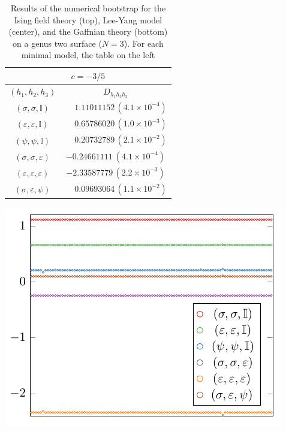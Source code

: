 \documentclass[a4paper,11pt]{article}
\begin{document}
\begin{table}[tbp]
\begin{minipage}{0.5\linewidth}
\centering
\begin{tabular}{|c|c|}
\multicolumn{2}{c}{$c=-3/5$}\\
\hline 
  $(h_1, h_2, h_3)$ &  $D_{h_1 h_2 h_3}$ \\ 
 \hline
 $(\sigma, \sigma, \mathbb{I})$ &            $\phantom{-}1.11011152\,(4.1\times10^{-4})$        \\
 $(\varepsilon, \varepsilon, \mathbb{I})$ &  $\phantom{-}0.65786020\,(1.0\times10^{-3})$        \\
 $(\psi, \psi, \mathbb{I})$   &              $\phantom{-}0.20732789\,(2.1\times10^{-2})$  \\
 $(\sigma, \sigma, \varepsilon)$ &           $-0.24661111\ (4.1\times 10^{-4})$\\
 $(\varepsilon, \varepsilon, \varepsilon)$ & $-2.33587779\, (2.2\times 10^{-3})$ \\
 $(\sigma, \varepsilon, \psi)$ &             $\phantom{-}0.09693064\,(1.1\times 10^{-2})$\\
 \hline
\end{tabular}
\end{minipage}
\begin{minipage}{0.5\linewidth}
 \centering 
 \includegraphics[width=\textwidth]{bootstrap_5-3_3.pdf}
\end{minipage}
\caption{\label{tab_bootstrap_results} Results of the numerical bootstrap for 
the Ising field theory (top), Lee-Yang model (center), and the Gaffnian theory (bottom) 
on a genus two surface ($N=3$). For each minimal model, the table on the left 
}
\end{table}
\end{document}
